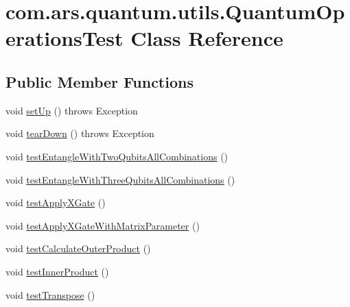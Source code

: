 \hypertarget{classcom_1_1ars_1_1quantum_1_1utils_1_1_quantum_operations_test}{}\section{com.\+ars.\+quantum.\+utils.\+Quantum\+Operations\+Test Class Reference}
\label{classcom_1_1ars_1_1quantum_1_1utils_1_1_quantum_operations_test}
\subsection*{Public Member Functions}
\begin{DoxyCompactItemize}
\item 
void \hyperlink{classcom_1_1ars_1_1quantum_1_1utils_1_1_quantum_operations_test_a8f96706026f3d321f59725f30fdb0b5e}{set\+Up} ()  throws Exception 
\item 
void \hyperlink{classcom_1_1ars_1_1quantum_1_1utils_1_1_quantum_operations_test_a3875eec94e51a4e5ee40a21beb171fe8}{tear\+Down} ()  throws Exception 
\item 
void \hyperlink{classcom_1_1ars_1_1quantum_1_1utils_1_1_quantum_operations_test_afc5716dca716e29a0cdbcfe069a815a3}{test\+Entangle\+With\+Two\+Qubits\+All\+Combinations} ()
\item 
void \hyperlink{classcom_1_1ars_1_1quantum_1_1utils_1_1_quantum_operations_test_a71ffaf6b899b2a1586f7da357e0517ba}{test\+Entangle\+With\+Three\+Qubits\+All\+Combinations} ()
\item 
void \hyperlink{classcom_1_1ars_1_1quantum_1_1utils_1_1_quantum_operations_test_ad217b97170aecd9c9c5f5aa907ea60f2}{test\+Apply\+X\+Gate} ()
\item 
void \hyperlink{classcom_1_1ars_1_1quantum_1_1utils_1_1_quantum_operations_test_ae1c0eac5931019d8d1cbd48abc8adade}{test\+Apply\+X\+Gate\+With\+Matrix\+Parameter} ()
\item 
void \hyperlink{classcom_1_1ars_1_1quantum_1_1utils_1_1_quantum_operations_test_a7a1cf1c6b0b84064cea27c39c870e470}{test\+Calculate\+Outer\+Product} ()
\item 
void \hyperlink{classcom_1_1ars_1_1quantum_1_1utils_1_1_quantum_operations_test_a88f7c027a6f692b9fa2e5e89f18b4a3d}{test\+Inner\+Product} ()
\item 
void \hyperlink{classcom_1_1ars_1_1quantum_1_1utils_1_1_quantum_operations_test_a09270ff6a4f9ed716f38d2a911495e4a}{test\+Transpose} ()
\end{DoxyCompactItemize}


